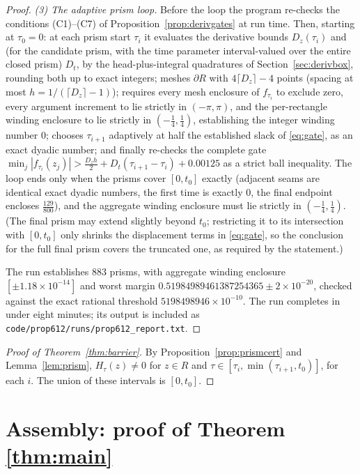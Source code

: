 \documentclass[11pt]{article}
\theoremstyle{definition}
\begin{document}
\begin{proof}
\emph{(3) The adaptive prism loop.} Before the loop the program
re-checks the conditions (C1)--(C7) of
Proposition~\ref{prop:derivgates} at run time. Then, starting at
$\tau_0=0$: at each prism start $\tau_i$ it evaluates the
derivative bounds $D_z(\tau_i)$ and (for the candidate prism, with
the time parameter interval-valued over the entire closed prism)
$D_t$, by the head-plus-integral quadratures of
Section~\ref{sec:derivbox}, rounding both up to exact integers;
meshes $\partial R$ with $4\lceil D_z\rceil-4$ points (spacing at
most $h=1/(\lceil D_z\rceil-1)$); requires every mesh enclosure of
$f_{\tau_i}$ to exclude zero, every argument increment to lie
strictly in $(-\pi,\pi)$, and the per-rectangle winding enclosure
to lie strictly in $(-\frac14,\frac14)$, establishing the integer
winding number $0$; chooses $\tau_{i+1}$ adaptively at half the
established slack of \eqref{eq:gate}, as an exact dyadic number; and
finally re-checks the complete gate
$\min_j|f_{\tau_i}(z_j)|>\frac{D_zh}2+D_t(\tau_{i+1}-\tau_i)
+0.00125$ as a strict ball inequality. The loop ends only when the
prisms cover $[0,t_0]$ exactly (adjacent seams are identical exact
dyadic numbers, the first time is exactly $0$, the final endpoint
encloses $\frac{129}{800}$), and the aggregate winding enclosure
must lie strictly in $(-\frac14,\frac14)$. (The final prism may
extend slightly beyond $t_0$; restricting it to its intersection
with $[0,t_0]$ only shrinks the displacement terms in
\eqref{eq:gate}, so the conclusion for the full final prism covers
the truncated one, as required by the statement.)

The run establishes $883$ prisms, with aggregate winding enclosure
$[\pm1.18\times10^{-14}]$ and worst margin
$0.51984989461387254365\pm2\times10^{-20}$, checked against the
exact rational threshold $5198498946\times10^{-10}$. The run
completes in under eight minutes; its output is
included as \texttt{code/prop612/runs/prop612\_report.txt}.
\end{proof}

\begin{proof}[Proof of Theorem~\ref{thm:barrier}]
By Proposition~\ref{prop:prismcert} and Lemma~\ref{lem:prism},
$H_\tau(z)\neq0$ for $z\in R$ and
$\tau\in[\tau_i,\min(\tau_{i+1},t_0)]$, for each $i$. The union of
these intervals is $[0,t_0]$.
\end{proof}

\section{Assembly: proof of Theorem \ref{thm:main}}
\end{document}
